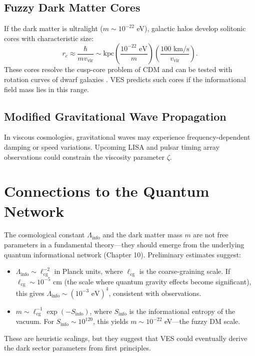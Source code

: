 \documentclass[12pt,a4paper]{book}
\begin{document}
\subsection{Fuzzy Dark Matter Cores}

If the dark matter is ultralight ($m \sim 10^{-22}$ eV), galactic halos develop solitonic cores with characteristic size:
\begin{equation}
    r_c \approx \frac{\hbar}{m v_{\text{vir}}} \sim \text{kpc} \left( \frac{10^{-22}\text{ eV}}{m} \right) \left( \frac{100\text{ km/s}}{v_{\text{vir}}} \right).
\end{equation}
These cores resolve the cusp-core problem of CDM and can be tested with rotation curves of dwarf galaxies \cite{hu2000fuzzy, schive2014core}. VES predicts such cores if the informational field mass lies in this range.

\subsection{Modified Gravitational Wave Propagation}

In viscous cosmologies, gravitational waves may experience frequency-dependent damping or speed variations. Upcoming LISA and pulsar timing array observations could constrain the viscosity parameter $\zeta$.

\section{Connections to the Quantum Network}

The cosmological constant $\Lambda_{\text{info}}$ and the dark matter mass $m$ are not free parameters in a fundamental theory—they should emerge from the underlying quantum informational network (Chapter 10). Preliminary estimates suggest:
\begin{itemize}
    \item $\Lambda_{\text{info}} \sim \ell_{\text{cg}}^{-2}$ in Planck units, where $\ell_{\text{cg}}$ is the coarse-graining scale. If $\ell_{\text{cg}} \sim 10^{-5}$ cm (the scale where quantum gravity effects become significant), this gives $\Lambda_{\text{info}} \sim (10^{-3}\text{ eV})^4$, consistent with observations.
    \item $m \sim \ell_{\text{cg}}^{-1} \exp(-S_{\text{info}})$, where $S_{\text{info}}$ is the informational entropy of the vacuum. For $S_{\text{info}} \sim 10^{120}$, this yields $m \sim 10^{-22}$ eV—the fuzzy DM scale.
\end{itemize}
These are heuristic scalings, but they suggest that VES could eventually derive the dark sector parameters from first principles.
\end{document}

